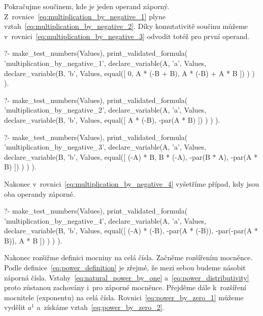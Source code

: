 Pokračujme součinem, kde je jeden operand záporný. Z~rovnice~\eqref{eq:multiplication_by_negative_1} plyne vztah~\eqref{eq:multiplication_by_negative_2}. Díky komutativitě součinu můžeme v~rovnici~\eqref{eq:multiplication_by_negative_3} odvodit totéž pro první operand. 

\begin{prolog}
?-	make_test_numbers(Values),
	print_validated_formula(
		'multiplication_by_negative_1',
		declare_variable(A, 'a', Values,
			declare_variable(B, 'b', Values,
				equal([
					0,
					A * (-B + B),
					A * (-B) + A * B
				])
			)
		)
	).
\end{prolog}
\begin{prolog}
?-	make_test_numbers(Values),
	print_validated_formula(
		'multiplication_by_negative_2',
		declare_variable(A, 'a', Values,
			declare_variable(B, 'b', Values,
				equal([
					A * (-B), -par(A * B)
				])
			)
		)
	).
\end{prolog}
\begin{prolog}
?-	make_test_numbers(Values),
	print_validated_formula(
		'multiplication_by_negative_3',
		declare_variable(A, 'a', Values,
			declare_variable(B, 'b', Values,
				equal([
					(-A) * B,
					B * (-A),
					-par(B * A),
					-par(A * B)
				])
			)
		)
	).
\end{prolog}

Nakonec v~rovnici~\eqref{eq:multiplication_by_negative_4} vyšetříme případ, kdy jsou oba operandy záporné.

\begin{prolog}
?-	make_test_numbers(Values),
	print_validated_formula(
		'multiplication_by_negative_4',
		declare_variable(A, 'a', Values,
			declare_variable(B, 'b', Values,
				equal([
					(-A) * (-B),
					-par(A * (-B)),
					-par(-par(A * B)),
					A * B
				])
			)
		)
	).
\end{prolog}

Nakonec rozšiřme definici mocniny na celá čísla. Začněme rozšířením mocněnce. Podle definice~\eqref{eq:power_definition} je zřejmé, že mezi sebou budeme násobit záporná čísla. Vztahy~\eqref{eq:natural_power_by_one} a~\eqref{eq:power_distributivity} proto zůstanou zachovány i~pro záporné mocněnce. Přejděme dále k~rozšíření mocnitele (exponentu) na celá čísla. Rovnici~\eqref{eq:power_by_zero_1} můžeme vydělit \(a^1\) a~získáme vztah~\eqref{eq:power_by_zero_2}.

